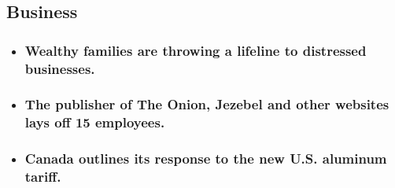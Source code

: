 \begin{itemize}
  \hypertarget{business}{%
  \subsection{Business}\label{business}}

  \begin{itemize}
  \item
    \href{https://www.nytimes.com/live/2020/08/07/business/stock-market-today-coronavirus?type=styln-live-updates\&label=business\&index=1\#wealthy-families-are-throwing-a-lifeline-to-distressed-businesses}{}

    \hypertarget{wealthy-families-are-throwing-a-lifeline-to-distressed-businesses}{%
    \subsubsection{Wealthy families are throwing a lifeline to
    distressed
    businesses.}\label{wealthy-families-are-throwing-a-lifeline-to-distressed-businesses}}
  \item
    \href{https://www.nytimes.com/live/2020/08/07/business/stock-market-today-coronavirus?type=styln-live-updates\&label=business\&index=1\#the-publisher-of-the-onion-jezebel-and-other-websites-lays-off-15-employees}{}

    \hypertarget{the-publisher-of-the-onion-jezebel-and-other-websites-lays-off-15-employees}{%
    \subsubsection{The publisher of The Onion, Jezebel and other
    websites lays off 15
    employees.}\label{the-publisher-of-the-onion-jezebel-and-other-websites-lays-off-15-employees}}
  \item
    \href{https://www.nytimes.com/live/2020/08/07/business/stock-market-today-coronavirus?type=styln-live-updates\&label=business\&index=1\#canada-outlines-its-response-to-the-new-us-aluminum-tariff}{}

    \hypertarget{canada-outlines-its-response-to-the-new-us-aluminum-tariff}{%
    \subsubsection{Canada outlines its response to the new U.S. aluminum
    tariff.}\label{canada-outlines-its-response-to-the-new-us-aluminum-tariff}}
  \end{itemize}
\end{itemize}

